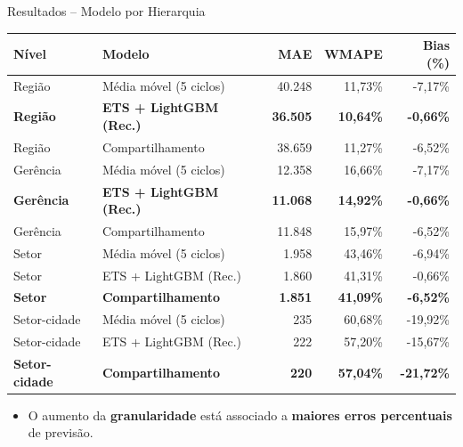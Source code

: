 \documentclass[aspectratio=169,11pt]{beamer}
\begin{document}
\begin{frame}{Resultados -- Modelo por Hierarquia}

\centering
\scriptsize

\renewcommand{\arraystretch}{1.12}
\setlength{\tabcolsep}{5pt}

\begin{tabular}{llrrr}
\toprule
\textbf{Nível} &
\textbf{Modelo} &
\textbf{MAE} &
\textbf{WMAPE} &
\textbf{Bias (\%)} \\
\midrule

Região & Média móvel (5 ciclos)
& 40.248 & 11,73\% & -7,17\% \\

\textbf{Região} & \textbf{ETS + LightGBM (Rec.)}
& \textbf{36.505} & \textbf{10,64\%} & \textbf{-0,66\%} \\

Região & Compartilhamento
& 38.659 & 11,27\% & -6,52\% \\

\midrule

Gerência & Média móvel (5 ciclos)
& 12.358 & 16,66\% & -7,17\% \\

\textbf{Gerência} & \textbf{ETS + LightGBM (Rec.)}
& \textbf{11.068} & \textbf{14,92\%} & \textbf{-0,66\%} \\

Gerência & Compartilhamento
& 11.848 & 15,97\% & -6,52\% \\

\midrule

Setor & Média móvel (5 ciclos)
& 1.958 & 43,46\% & -6,94\% \\

Setor & ETS + LightGBM (Rec.)
& 1.860 & 41,31\% & -0,66\% \\

\textbf{Setor} & \textbf{Compartilhamento}
& \textbf{1.851} & \textbf{41,09\%} & \textbf{-6,52\%} \\

\midrule

Setor-cidade & Média móvel (5 ciclos)
& 235 & 60,68\% & -19,92\% \\

Setor-cidade & ETS + LightGBM (Rec.)
& 222 & 57,20\% & -15,67\% \\

\textbf{Setor-cidade} & \textbf{Compartilhamento}
& \textbf{220} & \textbf{57,04\%} & \textbf{-21,72\%} \\

\bottomrule
\end{tabular}

\vspace{0.35cm}

\begin{minipage}{0.94\textwidth}
\footnotesize
\begin{itemize}
    \item O aumento da \textbf{granularidade} está
    associado a \textbf{maiores erros percentuais}
    de previsão.
\end{itemize}
\end{minipage}

\end{frame}
\end{document}
